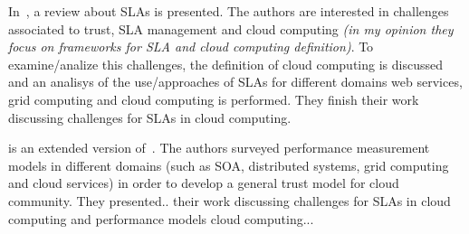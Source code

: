 \documentclass[12pt,a4paper,oneside]{book}
\begin{document}
\bigskip
In~\cite{002}, a review about SLAs is presented. The authors are interested in challenges associated to trust, SLA management and cloud computing \textit{(in my opinion they focus on frameworks for SLA and cloud computing definition)}. To examine/analize this challenges, the definition of cloud computing is discussed and an analisys of the use/approaches of SLAs for different domains web services, grid computing and cloud computing is performed. They finish their work discussing challenges for SLAs in cloud computing.

\bigskip
\cite{004} is an extended version of~\cite{002}. The authors surveyed performance measurement models in different domains (such as SOA, distributed systems, grid computing and cloud services) in order to develop a general trust model for cloud community. They presented.. their work discussing challenges for SLAs in cloud computing and performance models cloud computing...

\bigskip





\end{document}
